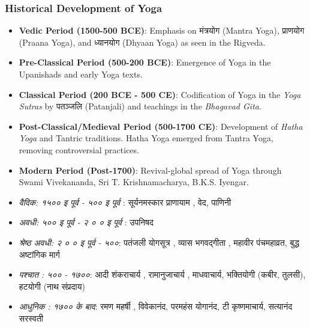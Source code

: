 \begin{frame}[fragile]\frametitle{Historical Development of Yoga}

      \begin{itemize}
		\item \textbf{Vedic Period (1500-500 BCE)}: Emphasis on मंत्रयोग (Mantra Yoga), प्राणयोग (Praana Yoga), and ध्यानयोग (Dhyaan Yoga) as seen in the Rigveda.
		\item \textbf{Pre-Classical Period (500-200 BCE)}: Emergence of Yoga in the Upanishads and early Yoga texts.
		\item \textbf{Classical Period (200 BCE - 500 CE)}: Codification of Yoga in the \textit{Yoga Sutras} by पतञ्जलि (Patanjali) and teachings in the \textit{Bhagavad Gita}.
		\item \textbf{Post-Classical/Medieval Period (500-1700 CE)}: Development of \textit{Hatha Yoga} and Tantric traditions. Hatha Yoga emerged from Tantra Yoga, removing controversial practices.
		\item \textbf{Modern Period (Post-1700)}: Revival-global spread of Yoga through Swami Vivekananda, Sri T. Krishnamacharya, B.K.S. Iyengar.

		\item \textit{वैदिक: १५०० इ पूर्व - ५०० इ पूर्व }: सूर्यनमस्कार प्राणायाम , वेद, पाणिनी 
		\item \textit{अवधी: ५०० इ पूर्व -  २ ० ०  इ पूर्व }: उपनिषद
		\item \textit{श्रेष्ठ अवधी:  २ ० ०  इ पूर्व - ५००}: पतंजली  योगसूत्र , व्यास भगवद्गीता , महावीर पंचमहाव्रत, बुद्ध अष्टांगिक मार्ग 
		\item \textit{पश्चात : ५०० - १७००}: आदी शंकराचार्य , रामानुजाचार्य , माधवाचार्य, भक्तियोगी (कबीर, तुलसी), हटयोगी (नाथ संप्रदाय)
		\item \textit{आधुनिक : १७०० के बाद}: रमण महर्षी , विवेकानंद, परमहंस योगानंद, टी कृष्णमाचार्य, सत्यानंद सरस्वती 
		
	  \end{itemize}

\end{frame}

